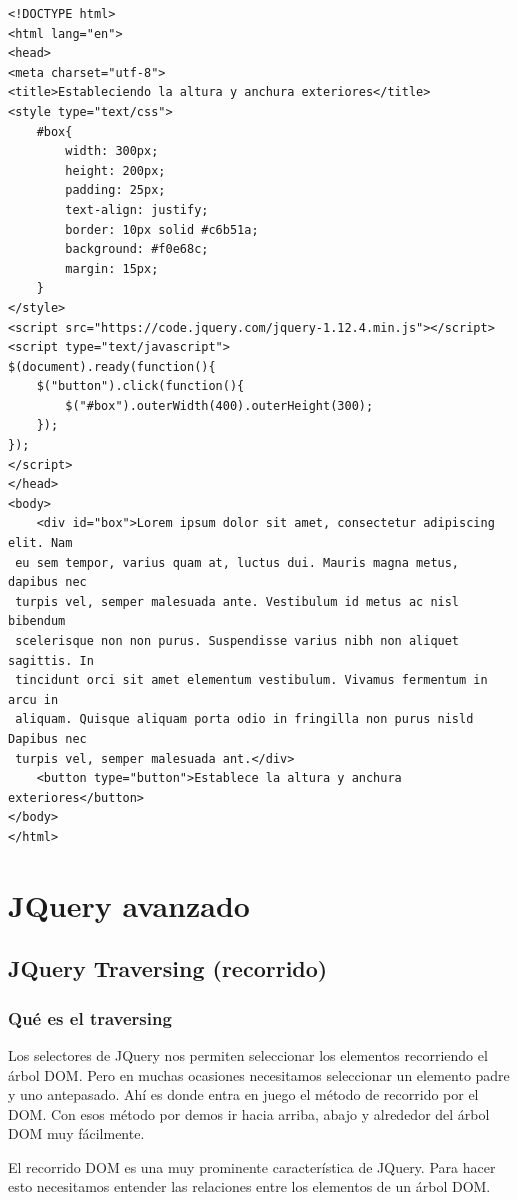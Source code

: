 \documentclass[a4paper, oneside]{article}
\begin{document}
\begin{verbatim}
<!DOCTYPE html>
<html lang="en">
<head>
<meta charset="utf-8">
<title>Estableciendo la altura y anchura exteriores</title>
<style type="text/css">
    #box{
        width: 300px;
        height: 200px;
        padding: 25px;
        text-align: justify;
        border: 10px solid #c6b51a;
        background: #f0e68c;
        margin: 15px;
    }        
</style>
<script src="https://code.jquery.com/jquery-1.12.4.min.js"></script>
<script type="text/javascript">
$(document).ready(function(){
    $("button").click(function(){
        $("#box").outerWidth(400).outerHeight(300);
    });
});
</script>
</head>
<body>
    <div id="box">Lorem ipsum dolor sit amet, consectetur adipiscing elit. Nam
 eu sem tempor, varius quam at, luctus dui. Mauris magna metus, dapibus nec
 turpis vel, semper malesuada ante. Vestibulum id metus ac nisl bibendum
 scelerisque non non purus. Suspendisse varius nibh non aliquet sagittis. In
 tincidunt orci sit amet elementum vestibulum. Vivamus fermentum in arcu in
 aliquam. Quisque aliquam porta odio in fringilla non purus nisld Dapibus nec
 turpis vel, semper malesuada ant.</div>
    <button type="button">Establece la altura y anchura exteriores</button>
</body>
</html>                                		
\end{verbatim}
\section{JQuery avanzado}
\label{sec:org9abb39f}

\subsection{JQuery Traversing (recorrido)}
\label{sec:org90a164b}

\subsubsection{Qué es el traversing}
\label{sec:org855e027}

Los selectores de JQuery nos permiten seleccionar los elementos recorriendo el árbol DOM. Pero en muchas ocasiones necesitamos seleccionar un elemento padre y uno antepasado. Ahí es donde entra en juego el método de recorrido por el DOM. Con esos método por demos ir hacia arriba, abajo y alrededor del árbol DOM muy fácilmente. 

El recorrido DOM es una muy prominente característica de JQuery. Para hacer esto necesitamos entender las relaciones entre los elementos de un árbol DOM. 
\end{document}
